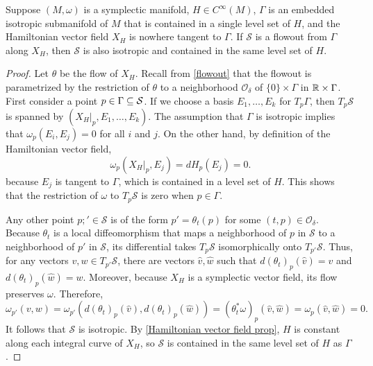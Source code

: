 \begin{theorem}\label{Hamiltonian flowout}
Suppose $(M,\omega)$ is a symplectic manifold, $H\in C^\infty(M)$, $\Gamma$ is an embedded isotropic submanifold of $M$ that is contained in a single level set of $H$, and the Hamiltonian vector field $X_H$ is nowhere tangent to $\Gamma$. If $\mathcal{S}$ is a flowout from $\Gamma$ along $X_H$, then $\mathcal{S}$ is also isotropic and contained in the same level set of $H$.
\end{theorem}
\begin{proof}
Let $\theta$ be the flow of $X_H$. Recall from \cref{flowout} that the flowout is parametrized by the restriction of $\theta$ to a neighborhood $\mathcal{O}_\delta$ of $\{0\}\times\Gamma$ in $\mathbb{R}\times\Gamma$. First consider a point $p\in\Gamma\subseteq\mathcal{S}$. If we choose a basis $E_1,\dots,E_k$ for $T_p\Gamma$, then $T_p\mathcal{S}$ is spanned by $(X_H|_p,E_1,\dots,E_k)$. The assumption that $\Gamma$ is isotropic implies that $\omega_p(E_i,E_j)=0$ for all $i$ and $j$. On the other hand, by definition of the Hamiltonian vector field,
\[\omega_p(X_H|_p,E_j)=dH_p(E_j)=0.\]
because $E_j$ is tangent to $\Gamma$, which is contained in a level set of $H$. This shows that the restriction of $\omega$ to $T_p\mathcal{S}$ is zero when $p\in\Gamma$.\par
Any other point $p;'\in\mathcal{S}$ is of the form $p'=\theta_t(p)$ for some $(t,p)\in\mathcal{O}_\delta$. Because $\theta_t$ is a local diffeomorphism that maps a neighborhood of $p$ in $\mathcal{S}$ to a neighborhood of $p'$ in $\mathcal{S}$, its differential takes $T_p\mathcal{S}$ isomorphically onto $T_{p'}\mathcal{S}$. Thus, for any vectors $v,w\in T_{p'}\mathcal{S}$, there are vectors $\widehat{v},\widehat{w}$ such that $d(\theta_t)_p(\widehat{v})=v$ and $d(\theta_t)_p(\widehat{w})=w$. Moreover, because $X_H$ is a symplectic vector field, its flow preserves $\omega$. Therefore,
\[\omega_{p'}(v,w)=\omega_{p'}(d(\theta_t)_p(\widehat{v}),d(\theta_t)_p(\widehat{w}))=(\theta_t^*\omega)_p(\widehat{v},\widehat{w})=\omega_p(\widehat{v},\widehat{w})=0.\]
It follows that $\mathcal{S}$ is isotropic. By \cref{Hamiltonian vector field prop}, $H$ is constant along each integral curve of $X_H$, so $\mathcal{S}$ is contained in the same level set of $H$ as $\Gamma$.
\end{proof}

\iffalse

